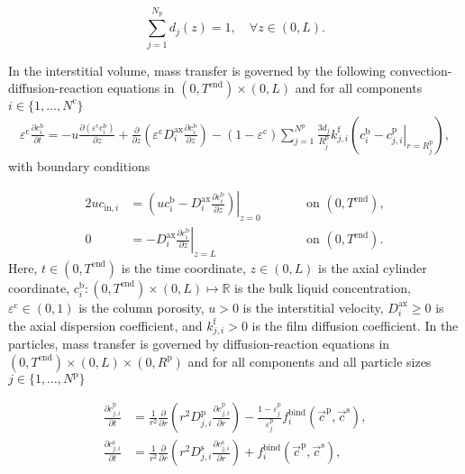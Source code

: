 \documentclass{article}
\begin{document}
    \begin{equation*}
	    \sum_{j=1}^{N_{\mathrm{p}}} d_j(z) = 1 , \quad \forall z \in (0, L).
    \end{equation*}

    
In the interstitial volume, mass transfer is governed by the following convection-diffusion-reaction equations in $(0, T^\mathrm{end})\times (0, L)$ and for all components $i\in\{1, \dots, N^{\mathrm{c}} \}$
\begin{align}
\varepsilon^{\mathrm{c}} \frac{\partial c^{\mathrm{b}}_i}{\partial t} = - u \frac{\partial \left( \varepsilon^{\mathrm{c}} c^{\mathrm{b}}_i \right)}{\partial z} + \frac{\partial}{\partial z} \left( \varepsilon^{\mathrm{c}} D^{\mathrm{ax}}_{i} \frac{\partial c^{\mathrm{b}}_i}{\partial z} \right)- \left(1 - \varepsilon^{\mathrm{c}} \right) \sum_{j=1}^{N^{\mathrm{p}}} \frac{3d_j}{R^{\mathrm{p}}_{j}} k^{\mathrm{f}}_{j,i} \left(c^{\mathrm{b}}_i - \left. c^{\mathrm{p}}_{j,i} \right|_{r = R^{\mathrm{p}}_{j}} \right),
\end{align}
with boundary conditions

\begin{alignat}{2}
u c_{\mathrm{in},i} &= \left.\left( u c^{\mathrm{b}}_i - D^{\mathrm{ax}}_{i} \frac{\partial c^{\mathrm{b}}_i}{\partial z}\right)\right|_{z=0} & &\qquad\text{on }(0, T^{\mathrm{end}}),\\
               0 &= - D^{\mathrm{ax}}_{i} \left. \frac{\partial c^{\mathrm{b}}_i}{\partial z} \right|_{z=L} & &\qquad\text{on }(0, T^{\mathrm{end}}).
\end{alignat}
Here, $t\in (0, T^{\mathrm{end}})$ is the time coordinate, $z\in (0, L)$ is the axial cylinder coordinate, $c^{\mathrm{b}}_i\colon (0, T^\mathrm{end})\times (0, L) \mapsto \mathbb{R}$ is the bulk liquid concentration, $\varepsilon^{\mathrm{c}}\in (0, 1)$ is the column porosity, $u> 0$ is the interstitial velocity, $D^\mathrm{ax}_i\geq 0$ is the axial dispersion coefficient, and $k^\mathrm{f}_{j,i}> 0$ is the film diffusion coefficient.
In the particles, mass transfer is governed by diffusion-reaction equations in $ (0, T^\mathrm{end}) \times (0, L)\times (0, R^{\mathrm{p}})$ and for all components and all particle sizes $j\in\{1, \dots, N^{\mathrm{p}}\}$

\begin{align}
\frac{\partial c^{\mathrm{p}}_{j,i}}{\partial t} &= \frac{1}{r^2} \frac{\partial }{\partial r} \left( r^2 D_{j,i}^{\mathrm{p}} \frac{\partial c^{\mathrm{p}}_{j,i}}{\partial r} \right) - \frac{1 - \varepsilon^{\mathrm{p}}_{j}}{\varepsilon^{\mathrm{p}}_{j}}f^{\mathrm{bind}}_{i}\left( \vec{c}^{\mathrm{p}}, \vec{c}^{\mathrm{s}} \right) , \\
\frac{\partial c^{\mathrm{s}}_{j,i}}{\partial t} &=  \frac{1}{r^2} \frac{\partial }{\partial r} \left( r^2 D_{j,i}^{\mathrm{s}} \frac{\partial c^{\mathrm{s}}_{j,i}}{\partial r} \right)  + f^{\mathrm{bind}}_{i}\left( \vec{c}^{\mathrm{p}}, \vec{c}^{\mathrm{s}} \right) ,
\end{align}
\end{document}
